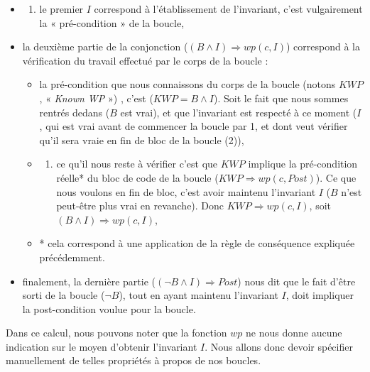 \documentclass[12pt,francais,]{scrbook}
\providecommand{\tightlist}{%
  \setlength{\itemsep}{0pt}\setlength{\parskip}{0pt}}
\begin{document}
\begin{itemize}
\item
  \begin{enumerate}
  \def\labelenumi{(\arabic{enumi})}
  \tightlist
  \item
    le premier \(I\) correspond à l'établissement de l'invariant, c'est
    vulgairement la « pré-condition » de la boucle,
  \end{enumerate}
\item
  la deuxième partie de la conjonction
  (\((B \wedge I) \Rightarrow wp(c, I)\)) correspond à la vérification
  du travail effectué par le corps de la boucle :

  \begin{itemize}
  \item
    la pré-condition que nous connaissons du corps de la boucle (notons
    \(KWP\), « \emph{Known WP} ») , c'est (\(KWP = B \wedge I\)). Soit
    le fait que nous sommes rentrés dedans (\(B\) est vrai), et que
    l'invariant est respecté à ce moment (\(I\), qui est vrai avant de
    commencer la boucle par 1, et dont veut vérifier qu'il sera vraie en
    fin de bloc de la boucle (2)),
  \item
    \begin{enumerate}
    \def\labelenumi{(\arabic{enumi})}
    \setcounter{enumi}{1}
    \tightlist
    \item
      ce qu'il nous reste à vérifier c'est que \(KWP\) implique la
      pré-condition réelle* du bloc de code de la boucle
      (\(KWP \Rightarrow wp(c, Post)\)). Ce que nous voulons en fin de
      bloc, c'est avoir maintenu l'invariant \(I\) (\(B\) n'est
      peut-être plus vrai en revanche). Donc
      \(KWP \Rightarrow wp(c, I)\), soit
      \((B \wedge I) \Rightarrow wp(c, I)\),
    \end{enumerate}
  \item
    * cela correspond à une application de la règle de conséquence
    expliquée précédemment.
  \end{itemize}
\item
  finalement, la dernière partie
  (\((\neg B \wedge I) \Rightarrow Post\)) nous dit que le fait d'être
  sorti de la boucle (\(\neg B\)), tout en ayant maintenu l'invariant
  \(I\), doit impliquer la post-condition voulue pour la boucle.
\end{itemize}

Dans ce calcul, nous pouvons noter que la fonction \(wp\) ne nous donne
aucune indication sur le moyen d'obtenir l'invariant \(I\). Nous allons
donc devoir spécifier manuellement de telles propriétés à propos de nos
boucles.
\end{document}
